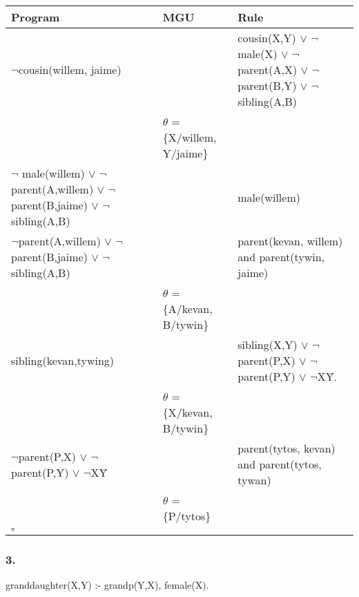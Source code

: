 \documentclass[10pt, a4paper]{article}
\begin{document}
\begin{tabular}{L{4cm} |L{3cm} |L{5cm}}
Program & MGU & Rule  \\
\hline \hline

$\neg$cousin(willem, jaime) &                                  & cousin(X,Y)  $\vee$ $\neg$ male(X) $\vee$ $\neg$parent(A,X) $\vee$ $\neg$parent(B,Y) $\vee$ $\neg$ sibling(A,B) \\

                            & $\theta$ = \{X/willem, Y/jaime\} & \\
\hline
$\neg$ male(willem) $\vee$ $\neg$parent(A,willem) $\vee$ $\neg$parent(B,jaime) $\vee$ \newline $\neg$ sibling(A,B) 
                            &                                  & male(willem) \\
\hline
$\neg$parent(A,willem) $\vee$ $\neg$parent(B,jaime) $\vee$ \newline $\neg$ sibling(A,B) 
                            &                                  & parent(kevan, willem) and parent(tywin, jaime) \\
                            & $\theta$ = \{A/kevan, B/tywin\}  & \\
\hline
sibling(kevan,tywing)         &                                & sibling(X,Y) $\vee$ $\neg$parent(P,X) $\vee$ $\neg$parent(P,Y) $\vee$ $\neg$X\=Y. \\
                             & $\theta$ = \{X/kevan, B/tywin\} & \\
\hline
$\neg$parent(P,X) $\vee$ $\neg$parent(P,Y) $\vee$ $\neg$X\=Y & & parent(tytos, kevan) and parent(tytos, tywan) \\
                             & $\theta$ = \{P/tytos\} & \\

\hline
$\square$ & & \\
\end{tabular}



\subsubsection{3.}
granddaughter(X,Y) :- grandp(Y,X), female(X).
\end{document}
